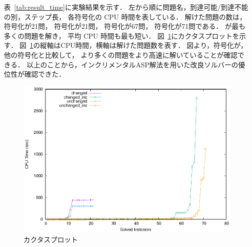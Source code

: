 表~\ref{tab:result_time}に実験結果を示す．
左から順に問題名，到達可能/到達不能の別，ステップ長，
各符号化の CPU 時間を表している．
解けた問題の数は，
符号化が21問，
符号化が21問，
符号化が67問，
符号化が71問である．
が最も多くの問題を解き，
平均 CPU 時間も最も短い．
%
図~\ref{fig:cactus}にカクタスプロットを示す．
図~\ref{fig:cactus}の縦軸はCPU時間，横軸は解けた問題数を表す．
図より，符号化が，他の符号化と比較して，
より多くの問題をより高速に解いていることが確認できる．
以上のことから，インクリメンタルASP解法を用いた改良ソルバーの優位性が確認できた．




\begin{figure}[t]
  \centering
  \includegraphics[scale=0.9]{fig/cactus.eps}
  \caption{カクタスプロット}
  \label{fig:cactus}
\end{figure}

